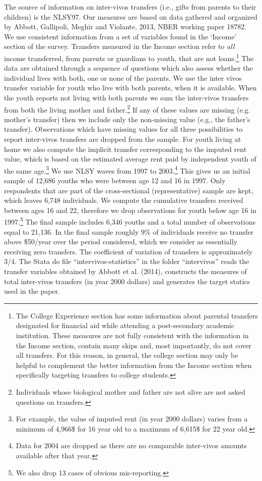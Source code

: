 \documentclass[a4paper,dvips,12pt]{article}
\begin{document}
The source of information on inter-vivos transfers (i.e., gifts from parents to their children) is the NLSY97. Our measures are based on data gathered and organized by Abbott, Gallipoli, Meghir and Violante, 2013, NBER working paper 18782. We use consistent information from a set of variables found in the `Income' section of the survey. Transfers measured in the Income section refer to \textit{all} income transferred, from parents or guardians to youth, that are not loans.\footnote{The College Experience section has some information about parental transfers designated for financial aid while attending a post-secondary academic institution. These measures are not fully consistent with the information in the Income section, contain many skips and, most importantly, do not cover all transfers. For this reason, in general, the college section may only be helpful to complement the better information from the Income section when specifically targeting transfers to college students.} The data are obtained through a sequence of questions which also assess whether the individual lives with both, one or none of the parents. We use the inter vivos transfer variable for youth who live with both parents, when it is available. When the youth reports not living with both parents we sum the inter-vivos transfers from both the living mother and father.\footnote{Individuals whose biological mother and father are not alive are not asked questions on transfers.} If any of these values are missing (e.g. mother's transfer) then we include only the non-missing value (e.g., the father's transfer). Observations which have missing values for all three possibilities to report inter-vivos transfers are dropped from the sample. For youth living at home we also compute the implicit transfer corresponding to the imputed rent value, which is based on the estimated average rent paid by independent youth of the same age.\footnote{For example, the value of imputed rent (in year 2000 dollars) varies from a minimum of 4,966\$ for 16 year old to a maximum of 6,615\$ for 22 year old.} We use NLSY waves from 1997 to 2003.\footnote{Data for 2004 are dropped as there are no comparable inter-vivos amounts available after that year.} This gives us an initial sample of 12,686 youths who were between age 12 and 16 in 1997. Only respondents that are part of the cross-sectional (representative) sample are kept, which leaves 6,748 individuals. We compute the cumulative transfers received between ages 16 and 22, therefore we drop observations for youth below age 16 in 1997.\footnote{We also drop 13 cases of obvious mis-reporting.}
The final sample includes 6,346 youths and a total number of observations equal to 21,136. In the final sample roughly 9\% of individuals receive no transfer above \$50/year over the period considered, which we consider as essentially receiving zero transfers. The coefficient of variation of transfers is approximately 3/4.
The Stata do file ``intervivos-statistics'' in the folder ``intervivos'' reads the transfer variables obtained by Abbott et al. (2014), constructs the measures of total inter-vivos transfers (in year 2000 dollars) and generates the target statics used in the paper.
\end{document}
